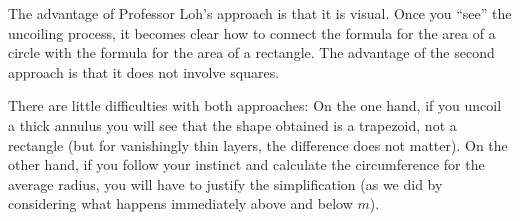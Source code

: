 \documentclass[12pt, a4]{article}
\begin{document}
The advantage of Professor Loh's approach is that it is visual. Once you ``see'' the uncoiling process, it becomes clear how to connect the formula for the area of a circle with the formula for the area of a rectangle. The advantage of the second approach is that it does not involve squares. 

There are little difficulties with both approaches: On the one hand, if you uncoil a thick annulus you will see that the shape obtained is a trapezoid, not a rectangle (but for vanishingly thin layers, the difference does not matter). On the other hand, if you follow your instinct and calculate the circumference for the average radius, you will have to justify the simplification (as we did by considering what happens immediately above and below $m$). 
\end{document}
